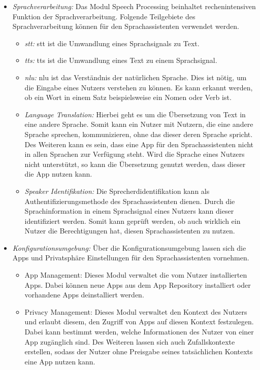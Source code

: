 \begin{itemize}
	\item \textsl{Sprachverarbeitung:} Das Modul Speech Processing beinhaltet rechenintensiven Funktion der Sprachverarbeitung. Folgende Teilgebiete des Sprachverarbeitung können für den Sprachassistenten verwendet werden.
	\begin{itemize}
		\item \textsl{\ac{stt}:} \ac{stt} ist die Umwandlung eines Sprachsignals zu Text.
		\item \textsl{\ac{tts}:} \ac{tts} ist die Umwandlung eines Text zu einem Sprachsignal.
		\item \textsl{\ac{nlu}:} \ac{nlu} ist das Verständnis der natürlichen Sprache. Dies ist nötig, um die Eingabe eines Nutzers verstehen zu können. Es kann erkannt werden, ob ein Wort in einem Satz beispielsweise ein Nomen oder Verb ist. 
		\item \textsl{Language Translation:} Hierbei geht es um die Übersetzung von Text in eine andere Sprache. Somit kann ein Nutzer mit Nutzern, die eine andere Sprache sprechen, kommunizieren, ohne das dieser deren Sprache spricht. Des Weiteren kann es sein, dass eine App für den Sprachassistenten nicht in allen Sprachen zur Verfügung steht. Wird die Sprache eines Nutzers nicht unterstützt, so kann die Übersetzung genutzt werden, dass dieser die App nutzen kann.
		\item \textsl{Speaker Identifikation:} Die Sprecherdidentifikation kann als Authentifizierungsmethode des Sprachassistenten dienen. Durch die Sprachinformation in einem Sprachsignal eines Nutzers kann dieser identifiziert werden. Somit kann geprüft werden, ob auch wirklich ein Nutzer die Berechtigungen hat, diesen Sprachassistenten zu nutzen.
	\end{itemize}
	\item \textsl{Konfigurationsumgebung:} Über die Konfigurationsumgebung lassen sich die Apps und Privatsphäre Einstellungen  für den Sprachassistenten vornehmen.
	\begin{itemize}
		\item App Management: Dieses Modul verwaltet die vom Nutzer installierten Apps. Dabei können neue Apps aus dem App Repository installiert oder vorhandene Apps deinstalliert werden. 	
		\item Privacy Management: Dieses Modul verwaltet den Kontext des Nutzers und erlaubt diesem, den Zugriff von Apps auf diesen Kontext festzulegen. Dabei kann bestimmt werden, welche Informationen des Nutzer von einer App zugänglich sind. Des Weiteren lassen sich auch Zufallskontexte erstellen, sodass der Nutzer ohne Preisgabe seines tatsächlichen Kontexts eine App nutzen kann.  
	\end{itemize}	
\end{itemize}






